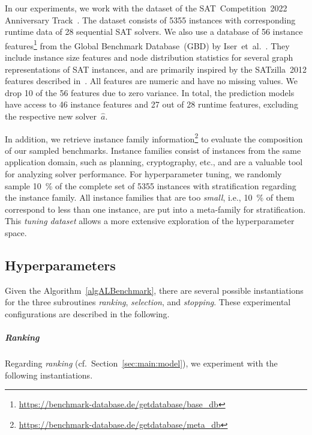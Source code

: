\documentclass[sn-basic, Numbered]{sn-jnl} %
\begin{document}
In our experiments, we work with the dataset of the SAT~Competition~2022 Anniversary Track~\cite{sat2022}.
The dataset consists of 5355 instances with corresponding runtime data of 28 sequential SAT solvers.
We also use a database of 56 instance features\footnote{\url{https://benchmark-database.de/getdatabase/base_db}} from the Global Benchmark Database~(GBD) by Iser~et~al.~\cite{IserS18}.
They include instance size features and node distribution statistics for several graph representations of SAT instances, and are primarily inspired by the SATzilla~2012 features described in~\cite{features}.
All features are numeric and have no missing values.
We drop 10 of the 56 features due to zero variance.
In total, the prediction models have access to 46 instance features and 27 out of 28 runtime features, excluding the respective new solver~$\hat{a}$.

In addition, we retrieve instance family information\footnote{\url{https://benchmark-database.de/getdatabase/meta_db}} to evaluate the composition of our sampled benchmarks.
Instance families consist of instances from the same application domain, such as planning, cryptography, etc., and are a valuable tool for analyzing solver performance.
%
For hyperparameter tuning, we randomly sample \SI{10}{\%} of the complete set of 5355 instances with stratification regarding the instance family.
All instance families that are too \emph{small}, i.e., \SI{10}{\%} of them correspond to less than one instance, are put into a meta-family for stratification.
This \emph{tuning dataset} allows a more extensive exploration of the hyperparameter space.

\subsection{Hyperparameters}
\label{sec:exdesign:hyper}

Given the Algorithm~\ref{algALBenchmark}, there are several possible instantiations for the three subroutines \emph{ranking}, \emph{selection}, and \emph{stopping}.
These experimental configurations are described in the following.

\subparagraph{Ranking}

Regarding \emph{ranking} (cf.~Section~\ref{sec:main:model}), we experiment with the following instantiations.
\end{document}

